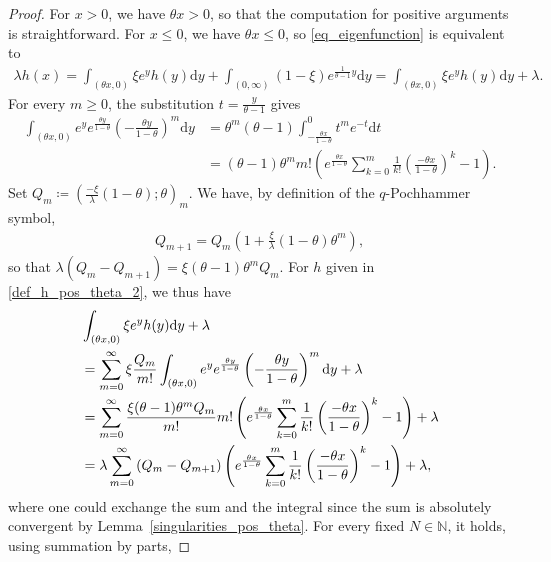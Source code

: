 \documentclass[12pt]{article}
\newcommand{\N}{\mathbb{N}} %
\newcommand{\1}{\mathds{1}}
\renewcommand{\d}{\mathrm{d}}
\theoremstyle{definition}
\theoremstyle{plain}
\theoremstyle{remark}
\begin{document}
\begin{proof}
For $x>0$, we have $\theta x>0$, so that the computation for positive arguments is straightforward.
For $x\le0$, we have $\theta x\le0$, so \eqref{eq_eigenfunction} is equivalent to
  \begin{align}\label{eq_eigenvalue_concrete}
      \lambda h(x)=\int_{(\theta x,0)}\!\!\!\!\!\!\!\xi  e^yh(y)\d y+\int_{(0,\infty)}\!\!\!\!\!\!\!(1-\xi)  e^{\frac{1}{\theta-1}y}\d y=\int_{(\theta x,0)}\!\!\!\!\!\!\!\xi  e^yh(y)\d y+\lambda. 
  \end{align}
 For every $m\ge 0$, the substitution $t=\frac{y}{\theta-1}$ gives
  \begin{align*}
     \int_{(\theta x,0)} e^ye^{\frac{\theta y}{1-\theta}}\left(-\frac{\theta y}{1-\theta}\right)^m\d y
     &=\theta^m(\theta-1)\int_{-\frac{\theta x}{1-\theta}}^0 t^m e^{-t}\d t
     \\&=(\theta-1)\theta^mm!\left(e^{\frac{\theta x}{1-\theta}}\sum_{k=0}^m\frac{1}{k!}\left(\frac{-\theta x}{1-\theta}\right)^k-1\right).
  \end{align*}
  Set $Q_m\coloneqq \left(\frac{-\xi}{\lambda}(1-\theta);\theta\right)_m$. We have, by definition of the $q$-Pochhammer symbol, 
  \begin{align*}
      Q_{m+1}=Q_m\left(1+\frac{\xi}{\lambda}(1-\theta)\theta^m\right),
  \end{align*}
  so that
      $\lambda\left(Q_{m}-Q_{m+1}\right)=\xi(\theta-1)\theta^m Q_m$.
  For $h$ given in \eqref{def_h_pos_theta_2}, we thus have
  \begin{align}\label{calculation_eigenfunction}
      &\int_{(\theta x,0)}\xi  e^yh(y)\d y+\lambda \notag
      \\&=\sum_{m=0}^\infty\xi\frac{Q_m}{m!}\int_{(\theta x,0)} e^ye^{\frac{\theta y}{1-\theta}}\left(-\frac{\theta y}{1-\theta}\right)^m\d y+\lambda\notag
    \\&=\sum_{m=0}^\infty\frac{\xi(\theta-1)\theta^mQ_m}{m!}m!\left(e^{\frac{\theta x}{1-\theta}}\sum_{k=0}^m\frac{1}{k!}\left(\frac{-\theta x}{1-\theta}\right)^k-1\right)+\lambda\notag
    \\&=\lambda\sum_{m=0}^\infty \left(Q_{m}-Q_{m+1}\right)\left(e^{\frac{\theta x}{1-\theta}}\sum_{k=0}^m\frac{1}{k!}\left(\frac{-\theta x}{1-\theta}\right)^k-1\right)+\lambda,
  \end{align}
where one could exchange the sum and the integral since the sum is absolutely convergent by Lemma~\ref{singularities_pos_theta}. For every fixed $N\in\N$, it holds, using summation by parts,

\end{proof}
\end{document}
